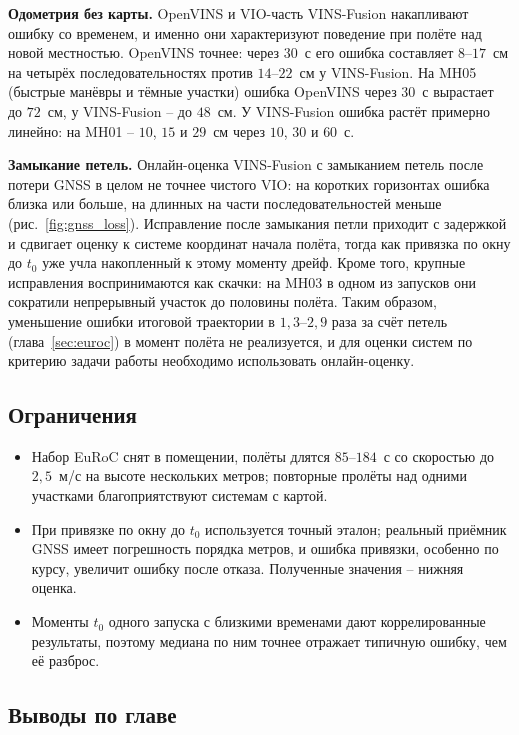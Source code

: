     \textbf{Одометрия без карты.}
    OpenVINS и VIO-часть VINS-Fusion накапливают ошибку со временем, и именно они характеризуют поведение при полёте над новой местностью.
    OpenVINS точнее: через $30$~с его ошибка составляет $8$--$17$~см на четырёх последовательностях против $14$--$22$~см у VINS-Fusion.
    На MH05 (быстрые манёвры и тёмные участки) ошибка OpenVINS через $30$~с вырастает до $72$~см, у VINS-Fusion -- до $48$~см.
    У VINS-Fusion ошибка растёт примерно линейно: на MH01 -- $10$, $15$ и $29$~см через $10$, $30$ и $60$~с.

    \textbf{Замыкание петель.}
    Онлайн-оценка VINS-Fusion с замыканием петель после потери GNSS в целом не точнее чистого VIO: на коротких горизонтах ошибка близка или больше, на длинных на части последовательностей меньше (рис.~\ref{fig:gnss_loss}).
    Исправление после замыкания петли приходит с задержкой и сдвигает оценку к системе координат начала полёта, тогда как привязка по окну до $t_0$ уже учла накопленный к этому моменту дрейф.
    Кроме того, крупные исправления воспринимаются как скачки: на MH03 в одном из запусков они сократили непрерывный участок до половины полёта.
    Таким образом, уменьшение ошибки итоговой траектории в $1{,}3$--$2{,}9$ раза за счёт петель (глава~\ref{sec:euroc}) в момент полёта не реализуется, и для оценки систем по критерию задачи работы необходимо использовать онлайн-оценку.

    \subsection{Ограничения}

    \begin{itemize}
        \item Набор EuRoC снят в помещении, полёты длятся $85$--$184$~с со скоростью до $2{,}5$~м/с на высоте нескольких метров; повторные пролёты над одними участками благоприятствуют системам с картой.
        \item При привязке по окну до $t_0$ используется точный эталон; реальный приёмник GNSS имеет погрешность порядка метров, и ошибка привязки, особенно по курсу, увеличит ошибку после отказа. Полученные значения -- нижняя оценка.
        \item Моменты $t_0$ одного запуска с близкими временами дают коррелированные результаты, поэтому медиана по ним точнее отражает типичную ошибку, чем её разброс.
    \end{itemize}

    \subsection{Выводы по главе}

